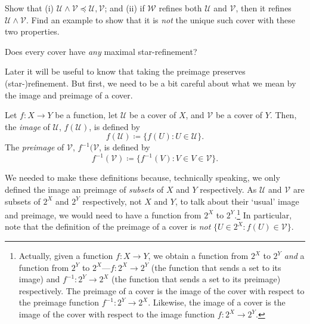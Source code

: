 \begin{exr}
Show that (i) $\mathcal{U}\wedge \mathcal{V}\preceq \mathcal{U},\mathcal{V}$; and (ii) if $\mathcal{W}$ refines both $\mathcal{U}$ and $\mathcal{V}$, then it refines $\mathcal{U}\wedge \mathcal{V}$.  Find an example to show that it is \emph{not} the unique such cover with these two properties.
\end{exr}
\begin{exr}
Does every cover have \emph{any} maximal star-refinement?
\end{exr}

Later it will be useful to know that taking the preimage preserves (star-)refinement.  But first, we need to be a bit careful about what we mean by the image and preimage of a cover.
\begin{dfn}
Let $f:X\rightarrow Y$ be a function, let $\mathcal{U}$ be a cover of $X$, and $\mathcal{V}$ be a cover of $Y$.  Then, the \emph{image} of $\mathcal{U}$, $f(\mathcal{U})$, is defined by
\begin{equation}
f(\mathcal{U})\coloneqq \{ f(U):U\in \mathcal{U}\} .
\end{equation}
The \emph{preimage} of $\mathcal{V}$, $f^{-1}(\mathcal{V}$, is defined by
\begin{equation}
f^{-1}(\mathcal{V})\coloneqq \{ f^{-1}(V):V\in V\in \mathcal{V}\} .
\end{equation}
\begin{rmk}
We needed to make these definitions because, technically speaking, we only defined the image an preimage of \emph{subsets} of $X$ and $Y$ respectively.  As $\mathcal{U}$ and $\mathcal{V}$ are subsets of $2^X$ and $2^Y$ respectively, not $X$ and $Y$, to talk about their `usual' image and preimage, we would need to have a function from $2^X$ to $2^Y$.\footnote{Actually, given a function $f:X\rightarrow Y$, we obtain a function from $2^X$ to $2^Y$ \emph{and} a function from $2^Y$ to $2^X$---$f:2^X\rightarrow 2^Y$ (the function that sends a set to its image) and $f^{-1}:2^Y\rightarrow 2^X$ (the function that sends a set to its preimage) respectively.  The preimage of a cover is the image of the cover with respect to the preimage function $f^{-1}:2^Y\rightarrow 2^X$.  Likewise, the image of a cover is the image of the cover with respect to the image function $f:2^X\rightarrow 2^Y$.}  In particular, note that the definition of the preimage of a cover is \emph{not} $\{ U\in 2^X:f(U)\in \mathcal{V}\}$.
\end{rmk}
\end{dfn}

